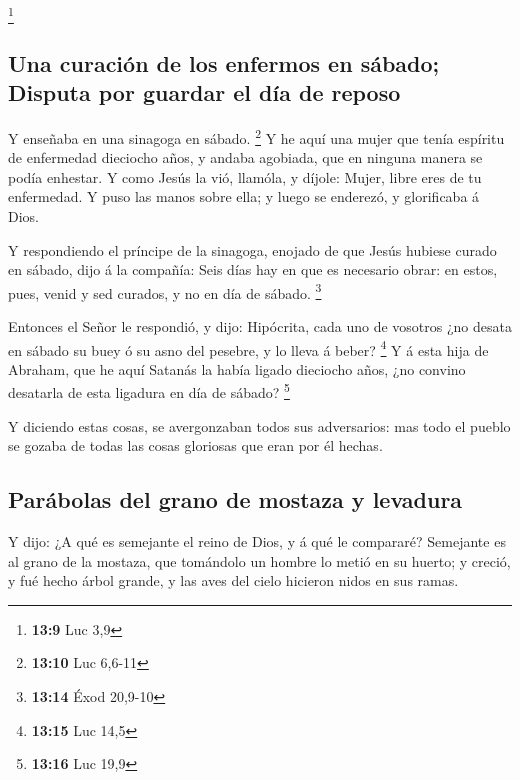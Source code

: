 \footnote{\textbf{13:9} Luc 3,9}

\hypertarget{una-curaciuxf3n-de-los-enfermos-en-suxe1bado-disputa-por-guardar-el-duxeda-de-reposo}{%
\subsection{Una curación de los enfermos en sábado; Disputa por guardar
el día de
reposo}\label{una-curaciuxf3n-de-los-enfermos-en-suxe1bado-disputa-por-guardar-el-duxeda-de-reposo}}

 Y enseñaba en una sinagoga en sábado. \footnote{\textbf{13:10}
  Luc 6,6-11}  Y he aquí una mujer que tenía espíritu de
enfermedad dieciocho años, y andaba agobiada, que en ninguna manera se
podía enhestar.  Y como Jesús la vió, llamóla, y díjole:
Mujer, libre eres de tu enfermedad.  Y puso las manos sobre
ella; y luego se enderezó, y glorificaba á Dios.

 Y respondiendo el príncipe de la sinagoga, enojado de que
Jesús hubiese curado en sábado, dijo á la compañía: Seis días hay en que
es necesario obrar: en estos, pues, venid y sed curados, y no en día de
sábado. \footnote{\textbf{13:14} Éxod 20,9-10}

 Entonces el Señor le respondió, y dijo: Hipócrita, cada
uno de vosotros ¿no desata en sábado su buey ó su asno del pesebre, y lo
lleva á beber? \footnote{\textbf{13:15} Luc 14,5}  Y á esta
hija de Abraham, que he aquí Satanás la había ligado dieciocho años, ¿no
convino desatarla de esta ligadura en día de sábado? \footnote{\textbf{13:16}
  Luc 19,9}

 Y diciendo estas cosas, se avergonzaban todos sus
adversarios: mas todo el pueblo se gozaba de todas las cosas gloriosas
que eran por él hechas.

\hypertarget{paruxe1bolas-del-grano-de-mostaza-y-levadura}{%
\subsection{Parábolas del grano de mostaza y
levadura}\label{paruxe1bolas-del-grano-de-mostaza-y-levadura}}

 Y dijo: ¿A qué es semejante el reino de Dios, y á qué le
compararé?  Semejante es al grano de la mostaza, que
tomándolo un hombre lo metió en su huerto; y creció, y fué hecho árbol
grande, y las aves del cielo hicieron nidos en sus ramas.

